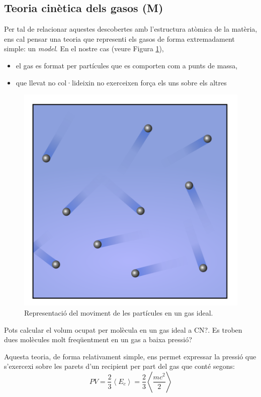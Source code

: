 \subsection{Teoria cinètica dels gasos (M)}

Per tal de relacionar aquestes descobertes amb l'estructura atòmica de la matèria, ens cal pensar una teoria que representi els gasos de forma extremadament simple: un \textit{model}. En el nostre cas (veure Figura \ref{fig:TeoriaCinetica}),
\begin{itemize}
\item el gas es format per partícules que es comporten com a punts de massa,
\item que llevat no col·lideixin no exerceixen força els uns sobre els altres
\end{itemize}
\begin{figure}[h]
\centering
\includegraphics[scale=0.2]{figures/TeoriaCinetica.png}
\caption{Representació del moviment de les partícules en un gas ideal.}
\label{fig:TeoriaCinetica}
\end{figure}
\begin{exr}
Pots calcular el volum ocupat per molècula en un gas ideal a CN?. Es troben dues molècules molt freqüentment en un gas a baixa pressió?
\end{exr}
Aquesta teoria, de forma relativament simple, ens permet expressar la pressió que s'exercexi sobre les parets d'un recipient per part del gas que conté segons:
\[
PV=\frac{2}{3} \left< E_c \right> = \frac{2}{3} \left< \frac{mc^2}{2} \right>
\]

